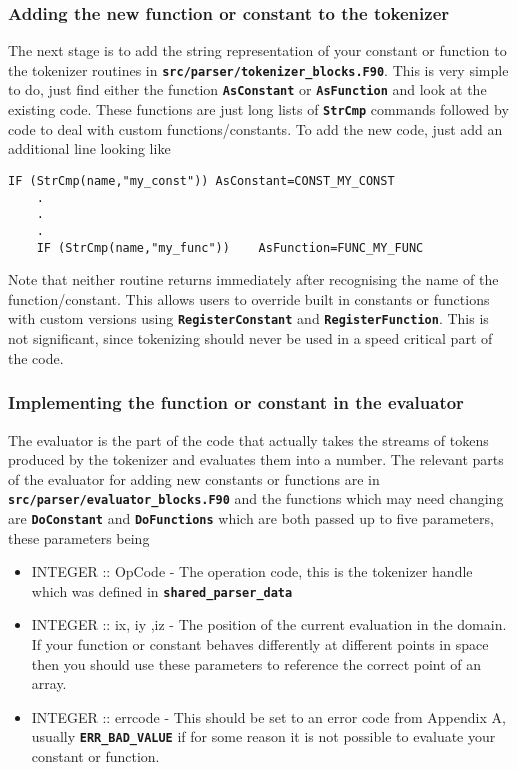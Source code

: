 \documentclass[12pt]{article}
\newcommand{\simpleboxverbatim}{\begin{Verbatim}[obeytabs=true,frame=single,
  framerule=0.5mm,rulecolor=\color{warwickmid}]}
\newcommand{\inlinecode}[1]{{\color{warwickred} \bf\texttt{#1}}}
\begin{document}
\subsubsection{Adding the new function or constant to the tokenizer}
The next stage is to add the string representation of your constant or function
to the tokenizer routines in
\inlinecode{src/parser/tokenizer\_blocks.F90}. This is very simple to do, just
find either the function \inlinecode{AsConstant} or \inlinecode{AsFunction} and
look at the existing code. These functions are just long lists of
\inlinecode{StrCmp} commands followed by code to deal with custom
functions/constants. To add the new code, just add an additional line looking
like
\simpleboxverbatim
    IF (StrCmp(name,"my_const")) AsConstant=CONST_MY_CONST
    .
    .
    .
    IF (StrCmp(name,"my_func"))    AsFunction=FUNC_MY_FUNC
\end{Verbatim}
Note that neither routine returns immediately after recognising the name of the
function/constant. This allows users to override built in constants or
functions with custom versions using \inlinecode{RegisterConstant} and
\inlinecode{RegisterFunction}. This is not significant, since tokenizing should
never be used in a speed critical part of the code.

\subsubsection{Implementing the function or constant in the evaluator}
The evaluator is the part of the code that actually takes the streams of tokens
produced by the tokenizer and evaluates them into a number. The relevant parts
of the evaluator for adding new constants or functions are in
\inlinecode{src/parser/evaluator\_blocks.F90} and the functions which may need
changing are \inlinecode{DoConstant} and \inlinecode{DoFunctions} which are
both passed up to five parameters, these parameters being
\begin{itemize}
\item INTEGER :: OpCode - The operation code, this is the tokenizer handle
  which was defined in \inlinecode{shared\_parser\_data}
\item INTEGER :: ix, iy ,iz - The position of the current evaluation in the
  domain. If your function or constant behaves differently at different points
  in space then you should use these parameters to reference the correct point
  of an array.
\item INTEGER :: errcode - This should be set to an error code from Appendix A,
  usually \inlinecode{ERR\_BAD\_VALUE} if for some reason it is not possible to
  evaluate your constant or function.
\end{itemize}
\end{document}
